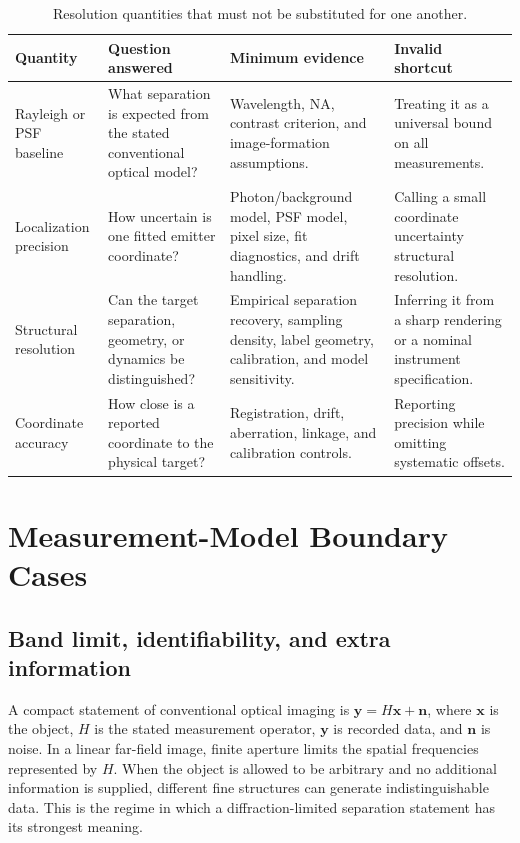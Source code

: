 \documentclass[conference]{IEEEtran}
\begin{document}
\begin{table}[t]
\caption{Resolution quantities that must not be substituted for one another.}
\label{tab:quantities}
\centering
\footnotesize
\setlength{\tabcolsep}{3pt}
\begin{tabular}{p{} p{} p{} p{}}
\hline
\textbf{Quantity} & \textbf{Question answered} & \textbf{Minimum evidence} & \textbf{Invalid shortcut}\\
\hline
Rayleigh or PSF baseline & What separation is expected from the stated conventional optical model? & Wavelength, NA, contrast criterion, and image-formation assumptions. & Treating it as a universal bound on all measurements.\\
Localization precision & How uncertain is one fitted emitter coordinate? & Photon/background model, PSF model, pixel size, fit diagnostics, and drift handling. & Calling a small coordinate uncertainty structural resolution.\\
Structural resolution & Can the target separation, geometry, or dynamics be distinguished? & Empirical separation recovery, sampling density, label geometry, calibration, and model sensitivity. & Inferring it from a sharp rendering or a nominal instrument specification.\\
Coordinate accuracy & How close is a reported coordinate to the physical target? & Registration, drift, aberration, linkage, and calibration controls. & Reporting precision while omitting systematic offsets.\\
\hline
\end{tabular}
\end{table}

\section{Measurement-Model Boundary Cases}

\subsection{Band limit, identifiability, and extra information}

A compact statement of conventional optical imaging is \(\mathbf{y}=H\mathbf{x}+\mathbf{n}\), where \(\mathbf{x}\) is the object, \(H\) is the stated measurement operator, \(\mathbf{y}\) is recorded data, and \(\mathbf{n}\) is noise. In a linear far-field image, finite aperture limits the spatial frequencies represented by \(H\). When the object is allowed to be arbitrary and no additional information is supplied, different fine structures can generate indistinguishable data. This is the regime in which a diffraction-limited separation statement has its strongest meaning.
\end{document}

